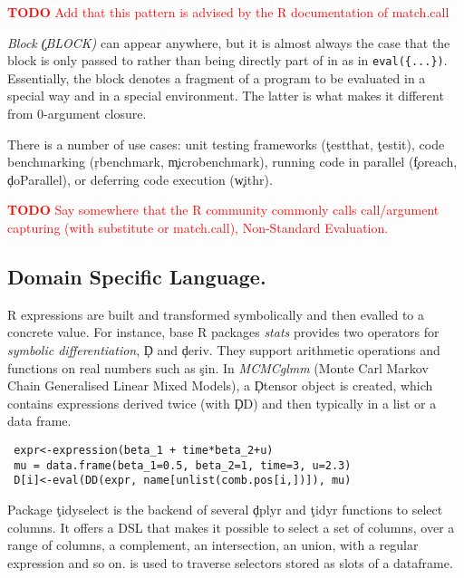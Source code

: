 \documentclass[review,screen,acmsmall,anonymous=true]{acmart}
\newcommand{\authorcomment}[3]{\xspace\textcolor{#1}{{\bf #2} #3}\xspace}
\newcommand{\todo}[1]{\authorcomment{red}{TODO}{#1}}
\begin{document}
\begin{compactitem}[---]
    \todo{Add that this pattern is advised by the R documentation of match.call}

  \item \emph{Block \c{(BLOCK)}} can appear anywhere, but it is almost always
    the case that the block is only passed to \eval rather than being directly
    part of in as in \lstinline|eval({...})|. Essentially, the block denotes a
    fragment of a program to be evaluated in a special way and in a special
    environment. The latter is what makes it different from 0-argument closure.

    There is a number of use cases: unit testing frameworks (\eg \c{testthat},
    \c{testit}), code benchmarking (\eg \c{rbenchmark}, \c{microbenchmark}),
    running code in parallel (\eg \c{foreach}, \c{doParallel}), or deferring
    code execution (\eg \c{withr}).

\end{compactitem}

\todo{Say somewhere that the R community commonly calls call/argument capturing (with substitute or match.call), Non-Standard Evaluation.}

\subsection{Domain Specific Language.} R expressions are built and transformed symbolically and then evalled to a concrete value. For instance,   base R packages \emph{stats} provides two operators for \emph{symbolic differentiation}, \c{D} and \c{deriv}. They support arithmetic operations and functions on real numbers such as \c{sin}.
In \emph{MCMCglmm} (Monte Carl Markov Chain Generalised Linear Mixed Models), a \c{Dtensor} object is created, which contains expressions derived twice (with \c{DD}) and then typically in a list or a data frame.
\begin{lstlisting}
 expr<-expression(beta_1 + time*beta_2+u)
 mu = data.frame(beta_1=0.5, beta_2=1, time=3, u=2.3)
 D[i]<-eval(DD(expr, name[unlist(comb.pos[i,])]), mu)
\end{lstlisting}

Package \c{tidyselect} is the backend of several \c{dplyr} and \c{tidyr} functions to select columns. It offers a DSL that makes it possible to select a set of columns, over a range of columns, a complement, an intersection, an union, with a regular expression and so on. \eval is used to traverse selectors stored as slots of a dataframe.
\end{document}
